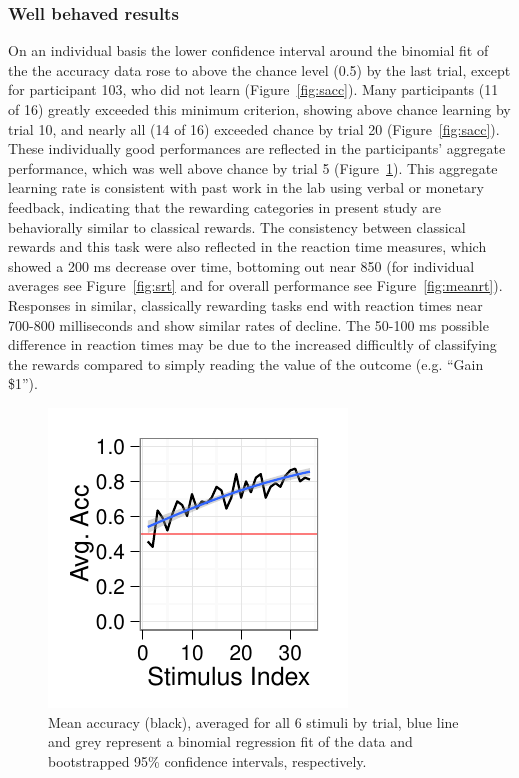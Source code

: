 \documentclass[doc,12pt]{apa}        %
\begin{document}
\subsubsection{Well behaved results}
\label{subsub:wellbehaved}
On an individual basis the lower confidence interval around the binomial fit of the the accuracy data rose to above the chance level (0.5) by the last trial, except for participant 103, who did not learn (Figure~\ref{fig:sacc}).  Many participants (11 of 16) greatly exceeded this minimum criterion, showing above chance learning by trial 10, and nearly all (14 of 16) exceeded chance by trial 20  (Figure~\ref{fig:sacc}).  These individually good performances are reflected in the participants' aggregate performance, which was well above chance by trial 5 (Figure~\ref{fig:meanacc}).  This aggregate learning rate is consistent with past work in the lab using verbal or monetary feedback, indicating that the rewarding categories in present study are behaviorally similar to classical rewards.  The consistency between classical rewards and this task were also reflected in the reaction time measures, which showed a 200 ms decrease over time, bottoming out near 850 (for individual averages see Figure~\ref{fig:srt} and for overall performance see Figure~\ref{fig:meanrt}).  Responses in similar, classically rewarding tasks end with reaction times near 700-800 milliseconds and show similar rates of decline.  The 50-100 ms possible difference in reaction times may be due to the increased difficultly of classifying the rewards compared to simply reading the value of the outcome (e.g. ``Gain \$1'').

\begin{figure}[tp]
	\includegraphics{f_all_mean_acc}
    \centering
	\caption{Mean accuracy (black), averaged for all 6 stimuli by trial, blue line and grey represent a binomial regression fit of the data and bootstrapped 95\% confidence intervals, respectively.}
	\label{fig:meanacc}
\end{figure}
\end{document}

